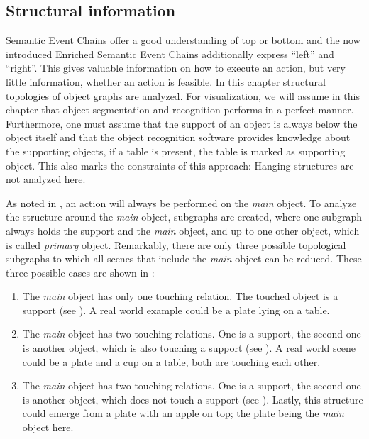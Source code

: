 \subsection{Structural information}
\label{ssec:action_methods_structuralinformation}

Semantic Event Chains offer a good understanding of top or bottom and the now introduced Enriched Semantic Event Chains additionally express ``left'' and ``right''.
This gives valuable information on how to execute an action, but very little information, whether an action is feasible.
In this chapter structural topologies of object graphs are analyzed.
For visualization, we will assume in this chapter that object segmentation and recognition performs in a perfect manner.
Furthermore, one must assume that the support of an object is always below the object itself and that the object recognition software provides knowledge about the supporting objects, \eg if a table is present, the table is marked as supporting object.
This also marks the constraints of this approach: Hanging structures are not analyzed here.

As noted in , an action will always be performed on the \emph{main} object.
To analyze the structure around the \emph{main} object, subgraphs are created, where one subgraph always holds the support and the \emph{main} object, and up to one other object, which is called \emph{primary} object.
Remarkably, there are only three possible topological subgraphs to which all scenes that include the \emph{main} object can be reduced.
These three possible cases are shown in :

\begin{enumerate}
  \item The \emph{main} object has only one touching relation. The touched object is a support (see ). A real world example could be a plate lying on a table.
  \item The \emph{main} object has two touching relations. One is a support, the second one is another object, which is also touching a support (see ). A real world scene could be a plate and a cup on a table, both are touching each other.
  \item The \emph{main} object has two touching relations. One is a support, the second one is another object, which does not touch a support (see ). Lastly, this structure could emerge from a plate with an apple on top; the plate being the \emph{main} object here.
\end{enumerate}

